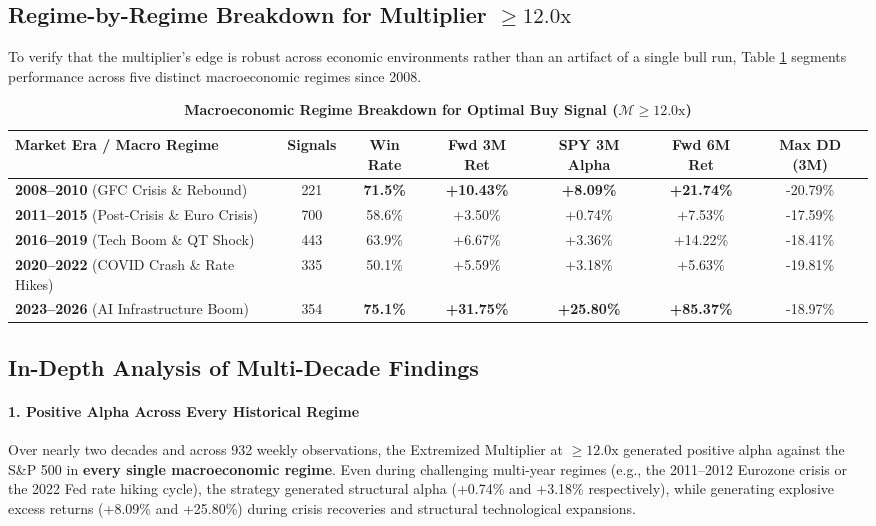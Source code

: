\documentclass[11pt]{article}
\begin{document}
\subsection{Regime-by-Regime Breakdown for Multiplier $\ge 12.0\text{x}$}

To verify that the multiplier's edge is robust across economic environments rather than an artifact of a single bull run, Table \ref{tab:regime_breakdown} segments performance across five distinct macroeconomic regimes since 2008.

\begin{table}[htbp]
\centering
\small
\caption{\textbf{Macroeconomic Regime Breakdown for Optimal Buy Signal ($\mathcal{M} \ge 12.0\text{x}$)}}
\label{tab:regime_breakdown}
\begin{tabularx}{\textwidth}{@{}X c c c c c c@{}}
\toprule
\textbf{Market Era / Macro Regime} & \textbf{Signals} & \textbf{Win Rate} & \textbf{Fwd 3M Ret} & \textbf{SPY 3M Alpha} & \textbf{Fwd 6M Ret} & \textbf{Max DD (3M)} \\
\midrule
\textbf{2008--2010} (GFC Crisis \& Rebound) & 221 & \textbf{71.5\%} & \textbf{+10.43\%} & \textbf{+8.09\%} & \textbf{+21.74\%} & -20.79\% \\
\textbf{2011--2015} (Post-Crisis \& Euro Crisis) & 700 & 58.6\% & +3.50\% & +0.74\% & +7.53\% & -17.59\% \\
\textbf{2016--2019} (Tech Boom \& QT Shock) & 443 & 63.9\% & +6.67\% & +3.36\% & +14.22\% & -18.41\% \\
\textbf{2020--2022} (COVID Crash \& Rate Hikes) & 335 & 50.1\% & +5.59\% & +3.18\% & +5.63\% & -19.81\% \\
\textbf{2023--2026} (AI Infrastructure Boom) & 354 & \textbf{75.1\%} & \textbf{+31.75\%} & \textbf{+25.80\%} & \textbf{+85.37\%} & -18.97\% \\
\bottomrule
\end{tabularx}
\end{table}

\subsection{In-Depth Analysis of Multi-Decade Findings}

\paragraph{1. Positive Alpha Across Every Historical Regime}
Over nearly two decades and across 932 weekly observations, the Extremized Multiplier at $\ge 12.0\text{x}$ generated positive alpha against the S\&P 500 in \textbf{every single macroeconomic regime}. Even during challenging multi-year regimes (e.g., the 2011--2012 Eurozone crisis or the 2022 Fed rate hiking cycle), the strategy generated structural alpha (+0.74\% and +3.18\% respectively), while generating explosive excess returns (+8.09\% and +25.80\%) during crisis recoveries and structural technological expansions.
\end{document}
